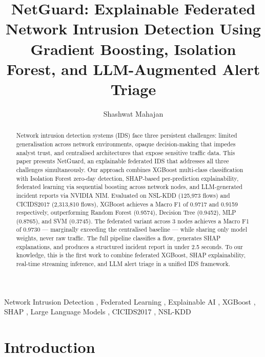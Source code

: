 \documentclass[review]{elsarticle}  %
\begin{document}
\begin{frontmatter}

\title{NetGuard: Explainable Federated Network Intrusion Detection
       Using Gradient Boosting, Isolation Forest, and LLM-Augmented Alert Triage}

\author[1]{Shashwat Mahajan}
\address[1]{Department of Computer Science and Engineering,
            Yeshwantrao Chavan College of Engineering, Nagpur, India}

\begin{abstract}
Network intrusion detection systems (IDS) face three persistent
challenges: limited generalisation across network environments,
opaque decision-making that impedes analyst trust, and centralised
architectures that expose sensitive traffic data. This paper
presents NetGuard, an explainable federated IDS that addresses
all three challenges simultaneously. Our approach combines
XGBoost multi-class classification with Isolation Forest
zero-day detection, SHAP-based per-prediction explainability,
federated learning via sequential boosting across network nodes,
and LLM-generated incident reports via NVIDIA NIM. Evaluated on
NSL-KDD (125,973 flows) and CICIDS2017 (2,313,810 flows),
XGBoost achieves a Macro F1 of 0.9717 and 0.9159 respectively,
outperforming Random Forest (0.9574), Decision Tree (0.9452),
MLP (0.8765), and SVM (0.3745). The federated variant across
3 nodes achieves a Macro F1 of 0.9730 — marginally exceeding
the centralised baseline — while sharing only model weights,
never raw traffic. The full pipeline classifies a flow, generates
SHAP explanations, and produces a structured incident report in
under 2.5 seconds. To our knowledge, this is the first work to
combine federated XGBoost, SHAP explainability, real-time
streaming inference, and LLM alert triage in a unified IDS
framework.
\end{abstract}

\begin{keyword}
Network Intrusion Detection \sep
Federated Learning \sep
Explainable AI \sep
XGBoost \sep
SHAP \sep
Large Language Models \sep
CICIDS2017 \sep
NSL-KDD
\end{keyword}

\end{frontmatter}

\linenumbers

\section{Introduction}
\end{document}
